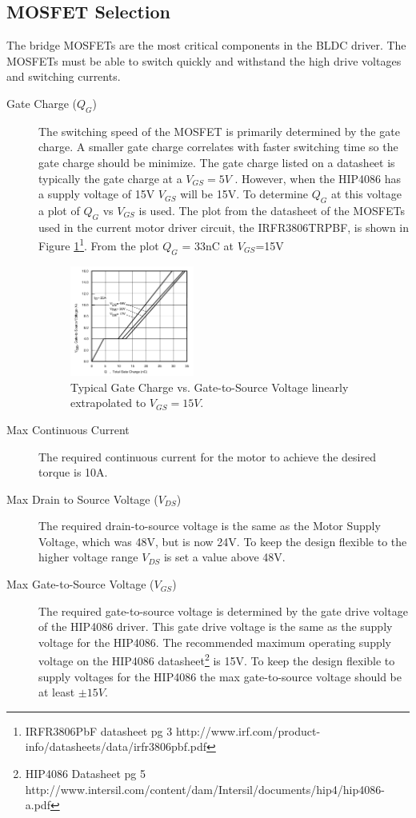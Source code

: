 \documentclass{article}
\begin{document}
\subsection{MOSFET Selection}
The bridge MOSFETs are the most critical components in the BLDC driver. The MOSFETs must be able to switch quickly and withstand the high drive voltages and switching currents. 
\begin{description}
\item[Gate Charge ($Q_G$)] The switching speed of the MOSFET is primarily determined by the gate charge. A smaller gate charge correlates with faster switching time so the gate charge should be minimize. The gate charge listed on a datasheet is typically the gate charge at a $V_{GS}= 5V$ . However, when the HIP4086 has a supply voltage of 15V $V_{GS}$ will be 15V. To determine $Q_G$ at this voltage a plot of $Q_G$ vs $V_{GS}$ is used. The plot from the datasheet of the MOSFETs used in the current motor driver circuit, the IRFR3806TRPBF, is shown in Figure \ref{fig:qg}\footnote{\raggedright IRFR3806PbF datasheet pg 3 http://www.irf.com/product-info/datasheets/data/irfr3806pbf.pdf}. From the plot $Q_G$ = 33nC at $V_{GS}$=15V
\begin{figure}[h]
	\centering
	\includegraphics[width=0.4\textwidth]{qg2}
	\caption{Typical Gate Charge vs. Gate-to-Source Voltage linearly extrapolated to $V_{GS}=15V$.}
	\label{fig:qg} 
\end{figure}


\item[Max Continuous Current]
The required continuous current for the motor to achieve the desired torque is 10A. 
\item[Max Drain to Source Voltage ($V_{DS}$)] The required drain-to-source voltage is the same as the Motor Supply Voltage, which was 48V, but is now 24V. To keep the design flexible to the higher voltage range $V_{DS}$ is set a value above 48V. 
\item[Max Gate-to-Source Voltage ($V_{GS}$)] The required gate-to-source voltage is determined by the gate drive voltage of the HIP4086 driver. This gate drive voltage is the same as the supply voltage for the HIP4086. The recommended maximum operating supply voltage on the HIP4086 datasheet\footnote{\raggedright HIP4086 Datasheet pg 5 http://www.intersil.com/content/dam/Intersil/documents/hip4/hip4086-a.pdf} is 15V. To keep the design flexible to supply voltages for the HIP4086 the max gate-to-source voltage should be at least $\pm15V$. 


\end{description}
\end{document}
